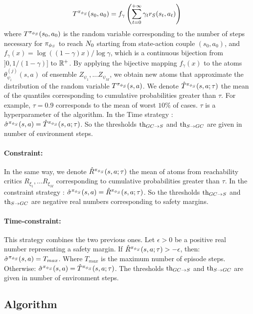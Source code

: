 \begin{equation}
    T^{\pi_{\phi_S}}(s_0, a_0) = f_{\gamma}\left(\sum_{t = 0}^{+\infty} \gamma_t r_S(s_t, a_t)\right) 
    \label{eq:time_and_rewards}
\end{equation}
where $T^{\pi_{\phi_S}}(s_0, a_0)$ is the random variable corresponding to the number of steps necessary for $\pi_{\phi_S}$ to reach 
$N_0$ starting from state-action couple $(s_0, a_0)$, and $f_{\gamma}(x) = \log \left( (1-\gamma)  x\right) / \log \gamma$,
which is a continuous bijection from $]0, 1/(1-\gamma)]$ to $\mathbb{R}^+$. By applying the bijective mapping $f_{\gamma}(x)$ to the atoms $\theta_{\psi_i}^{(j)}(s, a)$ 
of ensemble $Z_{\psi_1}, ... Z_{\psi_M}$, we obtain new atoms that approximate the distribution 
of the random variable $T^{\pi_{\phi_S}}(s, a)$.
We denote $\hat{T}^{\pi_{\phi_S}}(s, a ; \tau)$ the mean of the quantiles corresponding to cumulative probabilities 
greater than $\tau$. For example, $\tau = 0.9$ corresponds to the mean of worst $10\%$ of cases. $\tau$
is a hyperparameter of the algorithm. In the Time strategy : $\hat{\sigma}^{\pi_{\phi_S}}(s, a) = \hat{T}^{\pi_{\phi_S}}(s, a ; \tau)$.
So the thresholds $\text{th}_{GC \rightarrow S}$ and $\text{th}_{S \rightarrow GC}$ are given in number of environment steps.

\paragraph{\textbf{Constraint:}}
In the same way, we denote $\hat{R}^{\pi_{\phi_S}}(s, a ; \tau)$ the mean of atoms from reachability critics $R_{\xi_1}, ... R_{\xi_M}$
corresponding to cumulative probabilities greater than $\tau$. 
In the constraint strategy : $\hat{\sigma}^{\pi_{\phi_S}}(s, a) = \hat{R}^{\pi_{\phi_S}}(s, a ; \tau)$.
So the thresholds $\text{th}_{GC \rightarrow S}$ and $\text{th}_{S \rightarrow GC}$ are negative real numbers corresponding to safety margins.

\paragraph{\textbf{Time-constraint:}} This strategy combines the two previous ones. Let $\epsilon > 0$ be a positive real number 
representing a safety margin. If $\hat{R}^{\pi_{\phi_S}}(s, a ; \tau) > -\epsilon$, then: $\hat{\sigma}^{\pi_{\phi_S}}(s, a) = T_{max}$. 
Where $T_{max}$ is the maximum number of episode steps. 
Otherwise: $\hat{\sigma}^{\pi_{\phi_S}}(s, a) = \hat{T}^{\pi_{\phi_S}}(s, a ; \tau)$. 
The thresholds $\text{th}_{GC \rightarrow S}$ and $\text{th}_{S \rightarrow GC}$ are given in number of environment steps.

\subsection{Algorithm}

